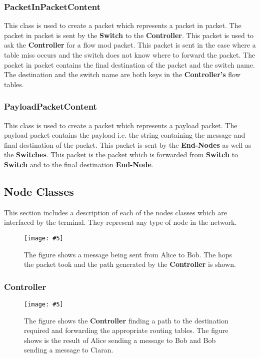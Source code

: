 \documentclass{article}
\newcommand{\includescalefigure}[5]{
  \begin{figure}[H]
    \centering
    \texttt{[image: \#5]}
    \captionsetup{width=.8\linewidth}
    \caption[#2]{#3}
    \label{#1}
  \end{figure}
}
\begin{document}
\subsubsection{PacketInPacketContent}
This class is used to create a packet which represents a packet in packet. The
packet in packet is sent by the \textbf{Switch} to the \textbf{Controller}.
This packet is used to ask the \textbf{Controller} for a flow mod packet. This
packet is sent in the case where a table miss occurs and the switch does not
know where to forward the packet. The packet in packet contains the final
destination of the packet and the switch name. The destination and the switch
name are both keys in the \textbf{Controller's} flow tables.

\subsubsection{PayloadPacketContent}
This class is used to create a packet which represents a payload packet. The
payload packet contains the payload i.e. the string containing the message and
final destination of the packet. This packet is sent by the \textbf{End-Nodes}
as well as the \textbf{Switches}. This packet is the packet which is forwarded
from \textbf{Switch} to \textbf{Switch} and to the final destination
\textbf{End-Node}.

\subsection{Node Classes}
This section includes a description of each of the nodes classes which are
interfaced by the terminal. They represent any type of node in the network.

\includescalefigure{SampleUsage}{Sample usage of protocol}{The figure shows a
  message being sent from Alice to Bob. The hops the packet took and the path
generated by the \textbf{Controller} is shown.}{1}{SampleUsage.png}

\subsubsection{Controller}

\includescalefigure{ControllerRoutePacketForwarding}{Controller doing work}{The
  figure shows the \textbf{Controller} finding a path to the destination
  required and forwarding the appropriate routing tables. The figure shows is
  the result of Alice sending a message to Bob and Bob sending a message to
Ciaran.}{1}{ControllerRoutePacketForwarding.png}
\end{document}
